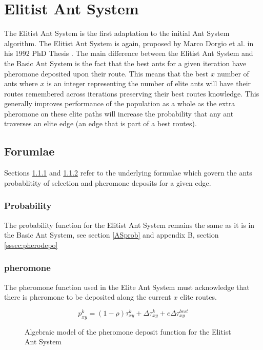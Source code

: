 \section{Elitist Ant System}
\label{eliteymcneaty}
The Elitist Ant System is the first adaptation to the initial Ant System algorithm. The Elitist Ant System is again, proposed by Marco Dorgio et al. in his 1992 PhD Thesis \cite{Dor1992:thesis}. The main difference between the Elitist Ant System and the Basic Ant System is the fact that the best ants for a given iteration have pheromone deposited upon their route. This means that the best $x$ number of ants where $x$ is an integer representing the number of elite ants will have their routes remembered across iterations preserving their best routes knowledge. This generally improves performance of the population as a whole as the extra pheromone on these elite paths will increase the probability that any ant traverses an elite edge (an edge that is part of a best routes).

\subsection{Forumlae}

Sections \ref{EASprob} and \ref{EASphero} refer to the underlying formulae which govern the ants probablitity of selection and pheromone deposits for a given edge.

\subsubsection{Probability}
\label{EASprob}

The probability function for the Elitist Ant System remains the same as it is in the Basic Ant System, see section \ref{ASprob} and appendix B, section \ref{sssec:pherodepo}

\subsubsection{pheromone}
\label{EASphero}
The pheromone function used in the Elite Ant System must acknowledge that there is pheromone to be deposited along the current $x$ elite routes.

\begin{figure}[H]
\Large
\begin{equation}
p_{xy}^{k} = (1 - \rho)\tau_{xy}^{k} + \Delta\tau_{xy}^{k} + e\Delta\tau_{xy}^{best}
\end{equation}

\caption[Elitist Ant System Pheromone Function]{Algebraic model of the pheromone deposit function for the Elitist Ant System \cite{marcdorgio:book:EAS}}
\label{fig:EASpheromonefunc}

\end{figure}

